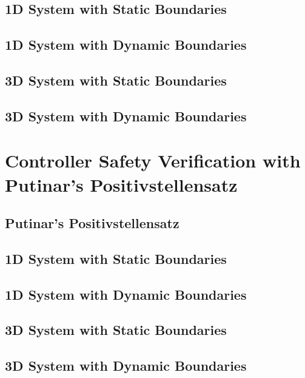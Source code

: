 \chapter{1D System with Static Boundaries}

\chapter{1D System with Dynamic Boundaries}

\chapter{3D System with Static Boundaries}

\chapter{3D System with Dynamic Boundaries}


\part[Controller Safety Verification with Putinar's Positivstellensatz]{Controller Safety Verification with \\Putinar's Positivstellensatz}  %
\chapter{Putinar's Positivstellensatz}\label{chap:putinar}
	
\chapter{1D System with Static Boundaries}
	
\chapter{1D System with Dynamic Boundaries}

\chapter{3D System with Static Boundaries}

\chapter{3D System with Dynamic Boundaries}



